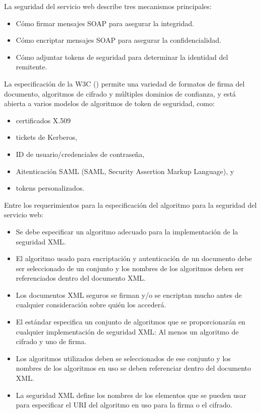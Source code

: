   	La seguridad del servicio web describe tres mecanismos principales:
  	
  	\begin{itemize}
  		\item Cómo firmar mensajes SOAP para asegurar la integridad. 
  		\item 	Cómo encriptar mensajes SOAP para asegurar la confidencialidad.
  		\item 	Cómo adjuntar tokens de seguridad para determinar la identidad del remitente.
  	 
  	\end{itemize}
  	 
  	 La especificación de la W3C (\WC)  permite una variedad de formatos de firma del documento, algoritmos de cifrado y múltiples dominios de confianza, y está abierta a varios modelos de algoritmos de token de seguridad, como:
  	 \begin{itemize}
  	 	\item certificados X.509
  	 	\item tickets de Kerberos,
  	 	\item ID de usuario/credenciales de contraseña,
  	 	\item Aitenticaci\'on SAML (SAML, Security Assertion Markup Language), y
  	 	\item tokens personalizados.
  	 \end{itemize}
  	 
  	Entre los requerimientos para la especificaci\'on del algoritmo para la seguridad del servicio web:
	\begin{itemize} 
		\item Se debe especificar un algoritmo adecuado para la implementación de la seguridad XML.
		\item El algoritmo usado para encriptación y autenticación de un documento debe ser seleccionado de un conjunto y los nombres de los algoritmos deben ser referenciados dentro del documento XML.
		\item Los documentos XML seguros se firman y/o se encriptan mucho antes de cualquier consideración sobre quién los accederá. 
 			\item El estándar especifica un conjunto de algoritmos que se proporcionarán en cualquier implementación de seguridad XML: Al menos un algoritmo de cifrado y uno de firma.
			\item Los algoritmos utilizados deben se seleccionados de ese conjunto y los nombres de los algoritmos en uso se deben referenciar dentro del documento XML.
			\item La seguridad XML define los nombres de los elementos que se pueden usar para especificar el URI del algoritmo en uso para la firma o el cifrado.
		\end{itemize}


